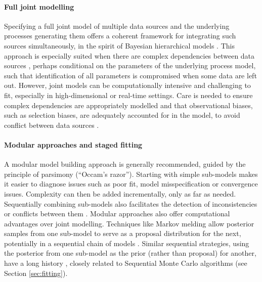 \documentclass{article}
\begin{document}
\paragraph{Full joint modelling}

Specifying a full joint model of multiple data sources and the underlying processes generating them offers a coherent framework for integrating such sources simultaneously, in the spirit of Bayesian hierarchical models \citep{gelman2020bayesian}. This approach is especially suited when there are complex dependencies between data sources \citep{corbella2022inferring}, perhaps conditional on the parameters of the underlying process model, such that identification of all parameters is compromised when some data are left out. However, joint models can be computationally intensive and challenging to fit, especially in high-dimensional or real-time settings. Care is needed to ensure complex dependencies are appropriately modelled and that observational biases, such as selection biases, are adequately accounted for in the model, to avoid conflict between data sources \citep{presanis2013conflict,corbella2022inferring}. 

\paragraph{Modular approaches and staged fitting}
A modular model building approach \citep{deangelis2018analysing,goudie2019joining,gelman2020bayesian,nicholson2022interoperability} is generally recommended, guided by the principle of parsimony (``Occam's razor''). 
Starting with simple sub-models makes it easier to diagnose issues such as poor fit, model misspecification or convergence issues. Complexity can then be added incrementally, only as far as needed. Sequentially combining sub-models also facilitates the detection of inconsistencies or conflicts between them \citep{presanis2013conflict,manderson2023combining}. Modular approaches also offer computational advantages over joint modelling. Techniques like Markov melding \citep{goudie2019joining} allow posterior samples from one sub-model to serve as a proposal distribution for the next, potentially in a sequential chain of models \citep{manderson2023combining}. Similar sequential strategies, using the posterior from one sub-model as the prior (rather than proposal) for another, have a long history \citep{west1997bayesian}, closely related to Sequential Monte Carlo algorithms \citep{doucet2001introduction} (see Section \ref{sec:fitting}).
\end{document}

